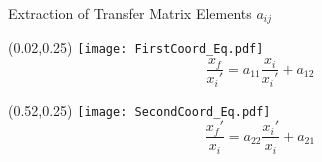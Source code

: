 \documentclass[10pt,aspectratio=169]{beamer}
\begin{document}
\begin{frame}{Extraction of Transfer Matrix Elements $a_{ij}$}
    \begin{textblock*}{0.5\paperwidth}(0.02\paperwidth,0.25\paperheight)
			\centering
			\texttt{[image: FirstCoord\_Eq.pdf]}
            \begin{equation*}
                \frac{x_f}{x_i'} = a_{11}\frac{x_i}{x_i'} + a_{12}
            \end{equation*}
		\end{textblock*}
    \begin{textblock*}{0.5\paperwidth}(0.52\paperwidth,0.25\paperheight)
			\centering
			\texttt{[image: SecondCoord\_Eq.pdf]}
            \begin{equation*}
                \frac{x_f'}{x_i} = a_{22}\frac{x_i'}{x_i} + a_{21}
            \end{equation*}
		\end{textblock*}
  
\end{frame}
\end{document}
